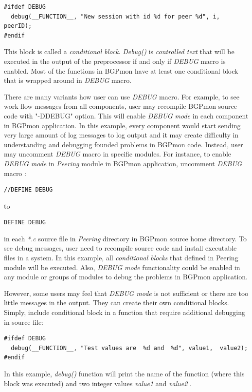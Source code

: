 \begin{verbatim}
#ifdef DEBUG
  debug(__FUNCTION__, "New session with id %d for peer %d", i, peerID);
#endif
\end{verbatim} 

This block is called a \emph{conditional block}. \emph{Debug()} is \emph{controlled text} that will be executed in the output of the preprocessor if and only if \emph{DEBUG} macro is enabled. Most of the functions in BGPmon have at least one conditional block that is wrapped around in  \emph{DEBUG}  macro. 

There are many variants how user can use \emph{DEBUG} macro.  For example, to see  work flow messages from all components, user may recompile BGPmon source code with "-DDEBUG" option. This will enable \emph{DEBUG mode} in each component in BGPmon application.  In this example,  every component would start sending very large amount of log messages to log output and it may create difficulty in understanding and debugging founded problems in BGPmon code.  Instead,  user may uncomment \emph{DEBUG} macro in specific modules. For instance, to enable \emph{DEBUG mode} in \emph{Peering} module in BGPmon application, uncomment \emph{DEBUG} macro :
\begin{verbatim}
//DEFINE DEBUG
\end{verbatim}
to
\begin{verbatim}
DEFINE DEBUG
\end{verbatim}

in each \emph{*.c} source file in \emph{Peering} directory in BGPmon source home directory. To see debug messages, user need to recompile source code and install executable files in a system. In this example,  all \emph{conditional blocks}  that defined in Peering module will be executed.  Also, \emph{DEBUG mode}  functionality could be enabled in any module or groups of modules to debug the problems in BGPmon application. 

However, some users may feel that \emph{DEBUG mode} is not sufficient or  there are too little messages in the output. They can create their own conditional blocks.  Simply,  include conditional block in a function that require additional debugging in source file:
\begin{verbatim}
#ifdef DEBUG
  debug(__FUNCTION__, "Test values are  %d and  %d", value1,  value2);
#endif
\end{verbatim}  

In this example, \emph{debug()} function will print the name of the function (where this block was executed) and two integer values \emph{value1} and \emph{value2} . 

